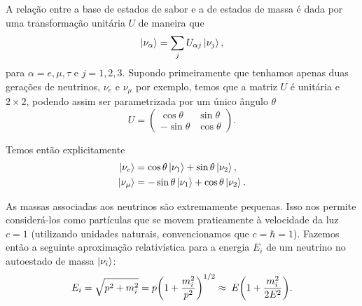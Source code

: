 \documentclass[12pt]{report}
\begin{document}
A relação entre a base de estados de sabor e a de estados de massa é dada por uma transformação unitária $U$ de maneira que
\begin{equation} \label{eq:unitaria}
\ket{\nu_\alpha} = \sum_{j} U_{\alpha j} \ket{\nu_j},
\end{equation}
para $\alpha = e, \mu, \tau$ e $j = 1, 2, 3$. Supondo primeiramente que tenhamos apenas duas gerações de neutrinos, $\nu_e$ e $\nu_\mu$ por exemplo, temos que a matriz $U$ é unitária e $2 \times 2$, podendo assim ser parametrizada por um único ângulo $\theta$
\begin{equation} \label{eq:mix2}
U =
\begin{pmatrix}
\cos\theta & \sin\theta \\
-\sin\theta & \cos\theta
\end{pmatrix}.
\end{equation}

Temos então explicitamente
\begin{equation}
\begin{split}
\ket{\nu_e} &= \cos \theta \ket{\nu_1} + \sin \theta \ket{\nu_2}, \\
\ket{\nu_\mu} &= -\sin \theta \ket{\nu_1} + \cos \theta \ket{\nu_2}.
\end{split}
\end{equation}

As massas associadas aos neutrinos são extremamente pequenas. Isso nos permite considerá-los como partículas que se movem praticamente à velocidade da luz $c = 1$ (utilizando unidades naturais, convencionamos que $c = \hbar = 1$). Fazemos então a seguinte aproximação relativística para a energia $E_i$ de um neutrino no autoestado de massa $\ket{\nu_i}$:
\begin{equation} \label{eq:aprox-energ}
E_i = \sqrt{p^2 + m_i^2} =
p \qty(1 + \frac{m_i^2}{p^2})^{1/2} \approx \; E \qty( 1 + \frac{m_i^2}{2 E^2} ).
\end{equation}
\end{document}
